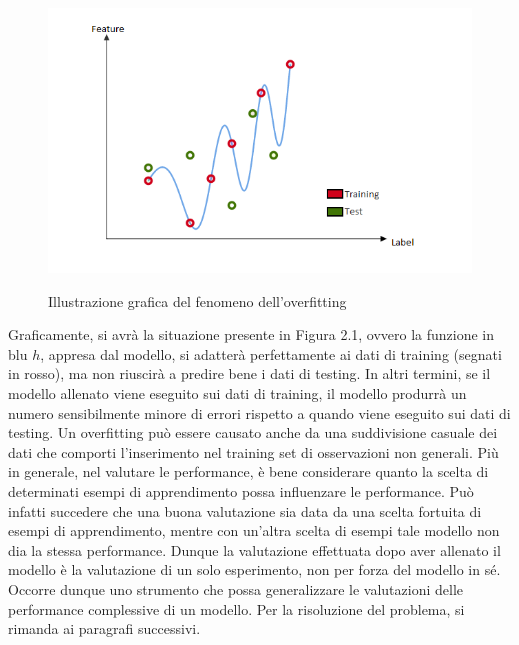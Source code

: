 \documentclass[11pt,  oneside, openany]{book}
\begin{document}
\begin{figure}[h!]
\begin{center}
  \includegraphics[width=13cm]{Immagini/Overfitting.png}\\
  \caption{Illustrazione grafica del fenomeno dell'overfitting}
\end{center}
\end{figure}

Graficamente, si avrà la situazione presente in Figura 2.1, ovvero la funzione in blu $h$, appresa dal modello, si adatterà perfettamente ai dati di training (segnati in rosso), ma non riuscirà a predire bene i dati di testing. In altri termini, se il modello allenato viene eseguito sui dati di training, il modello produrrà un numero sensibilmente minore di errori rispetto a quando viene eseguito sui dati di testing. Un overfitting può essere causato anche da una suddivisione casuale dei dati che comporti l'inserimento nel training set di osservazioni non generali. Più in generale, nel valutare le performance, è bene considerare quanto la scelta di determinati esempi di apprendimento possa influenzare le performance. Può infatti succedere che una buona valutazione sia data da una scelta fortuita di esempi di apprendimento, mentre con un'altra scelta di esempi tale modello non dia la stessa performance. Dunque la valutazione effettuata dopo aver allenato il modello è la valutazione di un solo esperimento, non per forza del modello in sé. Occorre dunque uno strumento che possa generalizzare le valutazioni delle performance complessive di un modello. Per la risoluzione del problema, si rimanda ai paragrafi successivi. 
\end{document}
